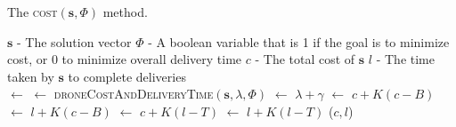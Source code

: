 \documentclass[journal]{IEEEtran}
\begin{document}
\begin{algorithm}[t!]
\caption{The \textsc{cost}$({\ensuremath{\mathbf{s}}},{\ensuremath{\Phi}})$ method.}
\label{alg:solution-cost}
\begin{algorithmic}
\Require
\Statex ${\ensuremath{\mathbf{s}}}$ - The solution vector
\Statex ${\ensuremath{\Phi}}$ - A boolean variable that is 1 if the goal is to minimize cost, or 0 to minimize overall delivery time
\Ensure
\Statex ${\ensuremath{c}}$ - The total cost of ${\ensuremath{\mathbf{s}}}$
\Statex ${\ensuremath{l}}$ - The time taken by ${\ensuremath{\mathbf{s}}}$ to complete deliveries
\\
{\State {${\ensuremath{\lambda}}$} $\gets$ {}}
{ $\gets$ {\textsc{droneCostAndDeliveryTime}$({\ensuremath{\mathbf{s}}},{\ensuremath{\lambda}},{\ensuremath{\Phi}})$}}
{ $\gets$ {${\ensuremath{\lambda}}+{\ensuremath{\gamma}}$}}
{ $\gets$ {${\ensuremath{c}} + {\ensuremath{K}} \left( {\ensuremath{c}} - {\ensuremath{B}} \right)$}}
{ $\gets$ {${\ensuremath{l}} + {\ensuremath{K}} \left( {\ensuremath{c}} - {\ensuremath{B}} \right)$}}
{ $\gets$ {${\ensuremath{c}} + {\ensuremath{K}} \left( {\ensuremath{l}} - {\ensuremath{T}} \right)$}}
{ $\gets$ {${\ensuremath{l}} + {\ensuremath{K}} \left( {\ensuremath{l}} - {\ensuremath{T}} \right)$}}
\EndIf
\State \Return (${\ensuremath{c}},{\ensuremath{l}}$)
\end{algorithmic}
\end{algorithm}
\end{document}
